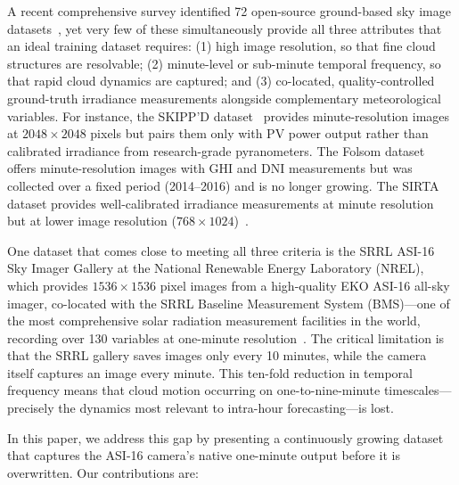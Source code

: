 \documentclass[twoside,11pt]{article}
\begin{document}
A recent comprehensive survey identified 72 open-source ground-based sky image datasets~\citep{nie2024survey}, yet very few of these simultaneously provide all three attributes that an ideal training dataset requires: (1) high image resolution, so that fine cloud structures are resolvable; (2) minute-level or sub-minute temporal frequency, so that rapid cloud dynamics are captured; and (3) co-located, quality-controlled ground-truth irradiance measurements alongside complementary meteorological variables. For instance, the SKIPP'D dataset~\citep{nie2023skippd} provides minute-resolution images at $2048 \times 2048$ pixels but pairs them only with PV power output rather than calibrated irradiance from research-grade pyranometers. The Folsom dataset~\citep{pedro2019comprehensive} offers minute-resolution images with GHI and DNI measurements but was collected over a fixed period (2014--2016) and is no longer growing. The SIRTA dataset provides well-calibrated irradiance measurements at minute resolution but at lower image resolution ($768 \times 1024$)~\citep{paletta2021benchmarking}.

One dataset that comes close to meeting all three criteria is the SRRL ASI-16 Sky Imager Gallery at the National Renewable Energy Laboratory (NREL), which provides $1536 \times 1536$ pixel images from a high-quality EKO ASI-16 all-sky imager, co-located with the SRRL Baseline Measurement System (BMS)---one of the most comprehensive solar radiation measurement facilities in the world, recording over 130 variables at one-minute resolution~\citep{nrel_srrl_bms}. The critical limitation is that the SRRL gallery saves images only every 10 minutes, while the camera itself captures an image every minute. This ten-fold reduction in temporal frequency means that cloud motion occurring on one-to-nine-minute timescales---precisely the dynamics most relevant to intra-hour forecasting---is lost.

In this paper, we address this gap by presenting a continuously growing dataset that captures the ASI-16 camera's native one-minute output before it is overwritten. Our contributions are:
\end{document}
